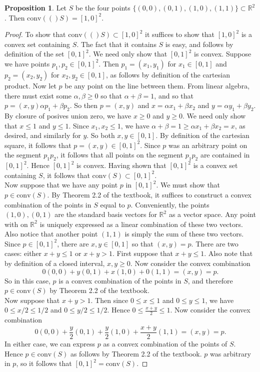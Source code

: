 \documentclass[12pt]{article}
\newcommand{\R}{\mathbb{R}}
\newcommand{\conv}[1]{\mbox{conv}(#1)}
\theoremstyle{definition}
\newtheorem{proposition}{Proposition}
\begin{document}
\begin{proposition} 
Let $S$ be the four points $\{(0,0),(0,1), (1,0),(1,1)\}\subset \R^2$. Then $\conv(S) =  [1,0]^2$. 
\end{proposition}
\begin{proof}
To show that $\conv(S)\subset [1,0]^2$ it suffices to show that $[1,0]^2$ is a convex set containing $S$. The fact that it contains $S$ is easy, and follows by definition of the set $[0,1]^2$. We need only show that $[0,1]^2$ is convex. Suppose we have points $p_1,p_2\in [0,1]^2$. Then $ p_1 = (x_1,y_1) $ for $x_1\in [0,1]$ and $p_2 = (x_2,y_2)$ for $x_2, y_2\in [0,1]$, as follows by definition of the cartesian product. Now let $p$ be any point on the line between them. From linear algebra, there must exist some $ \alpha,\beta \ge 0$ so that $\alpha + \beta = 1$, and so that $p = (x,y) \alpha p_1 + \beta p_2$. So then $p = (x,y)$ and $ x = \alpha x_1 + \beta x_2$ and $y = \alpha y_1 + \beta y_2$. By closure of posives union zero, we have $x \ge 0$ and $y\ge 0$. We need only show that $x\le 1$ and $y\le 1$. Since $x_1, x_2\le 1$, we have $\alpha + \beta = 1 \ge \alpha x_1 + \beta x_2 = x$, as desired, and similarly for $y$. So both $x,y\in [0,1]$. By definition of the cartesian square, it follows that $p = (x,y)\in [0,1]^2$. Since $p$ was an arbitrary point on the segment $p_1p_2$, it follows that all points on the segment $p_1p_2$ are contained in $[0,1]^2$. Hence $[0,1]^2$ is convex. Having shown that $[0,1]^2$ is a convex set containing $S$, it follows that $\conv{S}\subset [0,1]^2$.\\


Now suppose that we have any point $p$ in $[0,1]^2$. We must show that $ p\in \conv{S}$. By Theorem 2.2 of the textbook, it suffices to construct a convex combination of the points in $S$ equal to $p$.  Conveniently, the points $(1,0),(0,1)$ are the standard basis vectors for $\R^2$ as a vector space. Any point with on $\R^2$ is uniquely expressed as a linear combination of these two vectors. Also notice that another point $(1,1)$ is simply the sum of these two vectors. \\

Since $p\in [0,1]^2$, there are $x,y\in [0,1]$ so that $(x,y) = p$. There are two cases: either $x+y \le 1$ or $x+y > 1$. First suppose that $x+y\le 1$. Also note that by definition of a closed interval, $x,y \ge 0$. Now consider the convex combination 
$$0(0,0) + y(0,1) + x(1,0) + 0(1,1) = (x,y) = p.$$ So in this case, $p$ is a convex combination of the points in $S$, and therefore $p\in \conv{S}$ by Theorem 2.2 of the textbook.\\

Now suppose that $x + y >1$. Then since $0\le x \le 1$ and $0\le y\le 1$, we have $0\le x/2 \le 1/2$ and $0 \le  y/2 \le 1/2$. Hence $ 0 \le \frac{x  + y}{2} \le 1.$ Now consider the convex combination 
$$ 0(0,0) + \frac{y}{2}(0,1) + \frac{y}{2}(1,0) + \frac{x+y}{2}(1,1) = (x,y) = p.$$
In either case, we can express $p$ as a convex combination of the points of $S$. Hence $p\in \conv{S}$ as follows by Theorem 2.2 of the textbook. $p$ was arbitrary in $p$, so it follows that $[0,1]^2 = \conv{S}$.
\end{proof}
\end{document}
